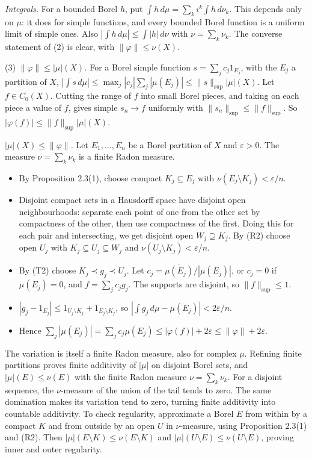 \documentclass[
  english,
  11pt,
  a4paper,
]{article}
\providecommand{\tightlist}{%
  \setlength{\itemsep}{0pt}\setlength{\parskip}{0pt}}
\begin{document}
\emph{Integrals.} For a bounded Borel \(h\), put
\(\int h\,d\mu=\sum_ki^k\int h\,d\nu_k\). This depends only on \(\mu\):
it does for simple functions, and every bounded Borel function is a
uniform limit of simple ones. Also \(|\int h\,d\mu|\leq\int|h|\,d\nu\)
with \(\nu=\sum_k\nu_k\). The converse statement of (2) is clear, with
\(\|\varphi\|\leq\nu(X)\).

(3) \emph{\(\|\varphi\|\leq|\mu|(X)\).} For a Borel simple function
\(s=\sum_jc_j1_{E_j}\), with the \(E_j\) a partition of \(X\),
\(|\int s\,d\mu|\leq\max_j|c_j|\sum_j|\mu(E_j)|\leq\|s\|_{\sup}|\mu|(X)\).
Let \(f\in C_0(X)\). Cutting the range of \(f\) into small Borel pieces,
and taking on each piece a value of \(f\), gives simple \(s_n\to f\)
uniformly with \(\|s_n\|_{\sup}\leq\|f\|_{\sup}\). So
\(|\varphi(f)|\leq\|f\|_{\sup}|\mu|(X)\).

\emph{\(|\mu|(X)\leq\|\varphi\|\).} Let \(E_1,\dots,E_n\) be a Borel
partition of \(X\) and \(\varepsilon>0\). The measure
\(\nu=\sum_k\nu_k\) is a finite Radon measure.

\begin{itemize}
\tightlist
\item
  By Proposition 2.3(1), choose compact \(K_j\subseteq E_j\) with
  \(\nu(E_j\setminus K_j)<\varepsilon/n\).
\item
  Disjoint compact sets in a Hausdorff space have disjoint open
  neighbourhoods: separate each point of one from the other set by
  compactness of the other, then use compactness of the first. Doing
  this for each pair and intersecting, we get disjoint open
  \(W_j\supseteq K_j\). By (R2) choose open \(U_j\) with
  \(K_j\subseteq U_j\subseteq W_j\) and
  \(\nu(U_j\setminus K_j)<\varepsilon/n\).
\item
  By (T2) choose \(K_j\prec g_j\prec U_j\). Let
  \(c_j=\overline{\mu(E_j)}/|\mu(E_j)|\), or \(c_j=0\) if
  \(\mu(E_j)=0\), and \(f=\sum_jc_jg_j\). The supports are disjoint, so
  \(\|f\|_{\sup}\leq1\).
\item
  \(|g_j-1_{E_j}|\leq1_{U_j\setminus K_j}+1_{E_j\setminus K_j}\), so
  \(|\int g_j\,d\mu-\mu(E_j)|<2\varepsilon/n\).
\item
  Hence
  \(\sum_j|\mu(E_j)|=\sum_jc_j\mu(E_j)\leq|\varphi(f)|+2\varepsilon\leq\|\varphi\|+2\varepsilon\).
\end{itemize}

The variation is itself a finite Radon measure, also for complex
\(\mu\). Refining finite partitions proves finite additivity of
\(|\mu|\) on disjoint Borel sets, and \(|\mu|(E)\leq\nu(E)\) with the
finite Radon measure \(\nu=\sum_k\nu_k\). For a disjoint sequence, the
\(\nu\)-measure of the union of the tail tends to zero. The same
domination makes its variation tend to zero, turning finite additivity
into countable additivity. To check regularity, approximate a Borel
\(E\) from within by a compact \(K\) and from outside by an open \(U\)
in \(\nu\)-measure, using Proposition 2.3(1) and (R2). Then
\(|\mu|(E\setminus K)\leq\nu(E\setminus K)\) and
\(|\mu|(U\setminus E)\leq\nu(U\setminus E)\), proving inner and outer
regularity.
\end{document}
